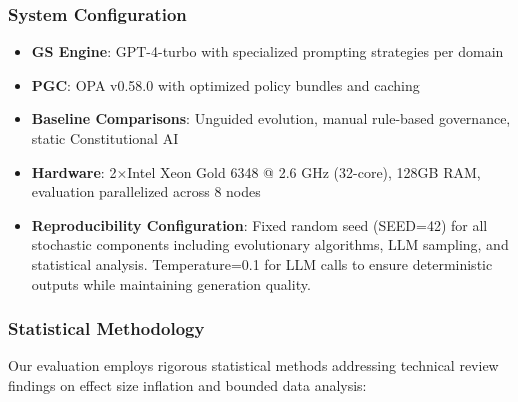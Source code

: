 \documentclass[sigconf,natbib]{acmart}
\begin{document}
\subsubsection{System Configuration}
\begin{itemize}
    \item \textbf{GS Engine}: GPT-4-turbo with specialized prompting strategies per domain
    \item \textbf{PGC}: OPA v0.58.0 with optimized policy bundles and caching
    \item \textbf{Baseline Comparisons}: Unguided evolution, manual rule-based governance, static Constitutional AI
    \item \textbf{Hardware}: 2×Intel Xeon Gold 6348 @ 2.6 GHz (32-core), 128GB RAM, evaluation parallelized across 8 nodes
    \item \textbf{Reproducibility Configuration}: Fixed random seed (SEED=42) for all stochastic components including evolutionary algorithms, LLM sampling, and statistical analysis. Temperature=0.1 for LLM calls to ensure deterministic outputs while maintaining generation quality.
\end{itemize}

\subsubsection{Statistical Methodology}
\label{subsubsec:statistical_methodology}
Our evaluation employs rigorous statistical methods addressing technical review findings on effect size inflation and bounded data analysis:
\end{document}
